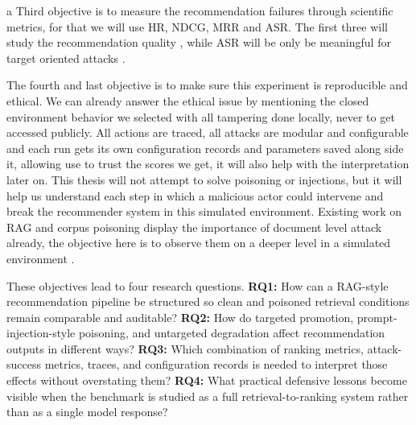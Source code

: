 a Third objective is to measure the recommendation failures through scientific metrics, for that we will use HR, NDCG, MRR and ASR. The first three will study the recommendation quality , while ASR will be only be meaningful for target oriented attacks \cite{herlocker2004evaluating,wang2013ndcg}. 

The fourth and last objective is to make sure this experiment is reproducible and ethical. We can already answer the ethical issue by mentioning the closed environment behavior we selected with all tampering done locally, never to get accessed publicly. All actions are traced, all attacks are modular and configurable and each run gets its own configuration records and parameters saved along side it, allowing use to trust the scores we get, it will also help with the interpretation later on. This thesis will not attempt to solve poisoning or injections, but it will help us understand each step in which a malicious actor could intervene and break the recommender system in this simulated environment. Existing work on RAG and corpus poisoning display the importance of document level attack already, the objective here is to observe them on a deeper level in a simulated environment \cite{lewis2020rag,gao2024ragsurvey,zhong2023retrievalcorpora,zou2025poisonedrag_usenix,ragpoisonlab_repo}.

These objectives lead to four research questions. \textbf{RQ1:} How can a RAG-style recommendation pipeline be structured so clean and poisoned retrieval conditions remain comparable and auditable? \textbf{RQ2:} How do targeted promotion, prompt-injection-style poisoning, and untargeted degradation affect recommendation outputs in different ways? \textbf{RQ3:} Which combination of ranking metrics, attack-success metrics, traces, and configuration records is needed to interpret those effects without overstating them? \textbf{RQ4:} What practical defensive lessons become visible when the benchmark is studied as a full retrieval-to-ranking system rather than as a single model response?
